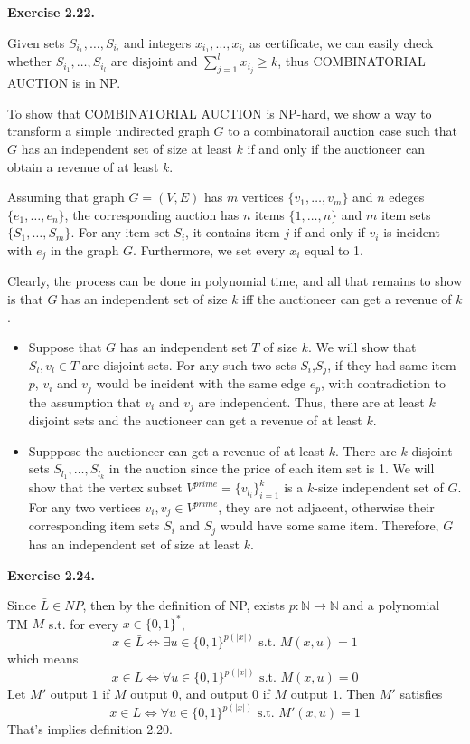 \documentclass[a4paper]{article}
\newenvironment{exercise}[1]{
	\par
	\noindent\textbf{Exercise #1.}\quad
}{
	\par
	\bigskip
}
\begin{document}
	\begin{exercise}{2.22}	
		Given sets $S_{i_1},\dots,S_{i_l}$ and integers $x_{i_1},\dots,x_{i_l}$ as certificate, we can easily check whether  $S_{i_1},\dots,S_{i_l}$ are disjoint and $\sum_{j=1}^l x_{i_j} \ge k$, thus COMBINATORIAL AUCTION is in NP.

		To show that COMBINATORIAL AUCTION is NP-hard, we show a way to transform a simple undirected graph $G$ to a combinatorail auction case such that $G$ has an independent set of size at least $k$ if and only if the auctioneer can obtain a revenue of at least $k$. 

		Assuming that graph $G=(V,E)$ has $m$ vertices $\{v_1,\dots,v_m \}$ and $n$ edeges $\{ e_1,\dots,e_n \}$, the corresponding auction has $n$ items $\{1,\dots,n \}$ and $m$ item sets $\{S_1,\dots,S_m \}$. For any item set $S_i$, it contains item $j$ if and only if $v_i$ is incident with $e_j$ in the graph $G$. Furthermore, we set every $x_i$ equal to 1.

		Clearly, the process can be done in polynomial time, and all that remains to show is that $G$ has an independent set of size $k$ iff the auctioneer can get a revenue of $k$.

		\begin{itemize}
			\item Suppose that $G$ has an independent set $T$ of size $k$. We will show that $S_l, v_l \in T$ are disjoint sets. For any such two sets $S_i$,$S_j$, if they had same item $p$, $v_i$ and $v_j$ would be incident with the same edge $e_p$, with contradiction to the assumption that $v_i$ and $v_j$ are independent. Thus, there are at least $k$ disjoint sets and  the auctioneer can get a revenue of at least $k$.
			
			\item Supppose the auctioneer can get a revenue of at least $k$. There are $k$ disjoint sets $S_{l_1},\dots,S_{l_k}$ in the auction since the price of each item set is 1. We will show that the vertex subset $V^{prime}=\{v_{l_i}\}_{i=1}^k$ is a $k$-size independent set of $G$. For any two vertices $v_i,v_j \in V^{prime}$, they are not adjacent, otherwise their corresponding item sets $S_i$ and $S_j$ would have some same item. Therefore, $G$ has an independent set of size at least $k$.

		\end{itemize}
	\end{exercise}

	\begin{exercise}{2.24}
	Since $\bar{L} \in NP$, then by the definition of NP, exists $p: \mathbb{N}\rightarrow \mathbb{N}$ and a polynomial TM $M$ s.t. for every $x \in \{0,1\}^{*}$,
$$x \in \bar{L} \Leftrightarrow \exists u \in \{0,1\}^{p(|x|)} \text{ s.t. } M(x,u) = 1$$
which means
$$x \in L \Leftrightarrow \forall u \in \{0,1\}^{p(|x|)} \text{ s.t. } M(x,u) = 0$$
Let $M'$ output $1$ if $M$ output $0$, and output $0$ if $M$ output $1$.
Then $M'$ satisfies
$$x \in L \Leftrightarrow \forall u \in \{0,1\}^{p(|x|)} \text{ s.t. } M'(x,u) = 1$$
That's implies definition 2.20.
\end{exercise}
\end{document}
